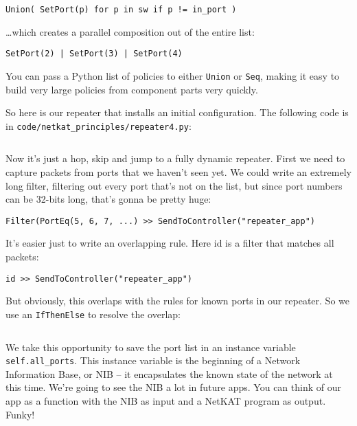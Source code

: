 \begin{verbatim}
Union( SetPort(p) for p in sw if p != in_port )
\end{verbatim}

\ldots which creates a parallel composition out of the entire list:

\begin{verbatim}
SetPort(2) | SetPort(3) | SetPort(4)
\end{verbatim}

You can pass a Python list of policies to either \texttt{Union} or \texttt{Seq}, making it easy to build 
very large policies from component parts very quickly.  

So here is our repeater that installs an initial configuration.
The following code is in \texttt{code/netkat\_principles/repeater4.py}:

\inputminted{python}{code/netkat_principles/repeater4.py}

Now it's just a hop, skip and  jump to a fully dynamic repeater.  First we need to capture packets from ports
that we haven't seen yet.  We could write an extremely long filter, filtering out every port that's not on the
list, but since port numbers can be 32-bits long, that's gonna be pretty huge:

\begin{verbatim}
Filter(PortEq(5, 6, 7, ...) >> SendToController("repeater_app")
\end{verbatim}

It's easier just to write an overlapping rule.  Here id is a filter that matches all packets:

\begin{verbatim}
id >> SendToController("repeater_app")
\end{verbatim}

But obviously, this overlaps with the rules for known ports in our repeater.  So we use an \texttt{IfThenElse} to 
resolve the overlap:

\inputminted[firstline=18,lastline=35]{python}{code/netkat_principles/repeater5.py}

We take this opportunity to save the port list in an instance variable \texttt{self.all\_ports}.  This instance variable
is the beginning of a Network Information Base, or NIB -- it encapsulates the known state of the network
at this time.  We're going to see the NIB a lot in future apps.  You can think of our app as a function with the
NIB as input and a NetKAT program as output.  Funky!

